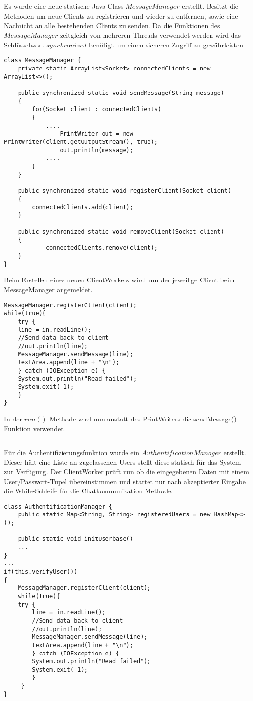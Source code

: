 \documentclass[12pt]{article}
\theoremstyle{plain}
\begin{document}
\subsection{}
Es wurde eine neue statische Java-Class $MessageManager$ erstellt.
Besitzt die Methoden um neue Clients zu registrieren und wieder zu entfernen, sowie eine Nachricht an alle bestehenden Clients zu senden.
Da die Funktionen des $MessageManager$ zeitgleich von mehreren Threads verwendet werden wird das Schlüsselwort $synchronized$ benötigt um einen sicheren Zugriff zu gewährleisten.
\begin{lstlisting}
class MessageManager {
	private static ArrayList<Socket> connectedClients = new ArrayList<>();

	public synchronized static void sendMessage(String message)
	{
		for(Socket client : connectedClients)
		{
			....			
				PrintWriter out = new PrintWriter(client.getOutputStream(), true);
				out.println(message);
			....
		}
	}

	public synchronized static void registerClient(Socket client)
	{
		connectedClients.add(client);
	}

	public synchronized static void removeClient(Socket client)
	{
			connectedClients.remove(client);
	}
}
\end{lstlisting}
Beim Erstellen eines neuen ClientWorkers wird nun der jeweilige Client beim MessageManager angemeldet.
\begin{lstlisting}
MessageManager.registerClient(client);
while(true){
	try {
	line = in.readLine();
	//Send data back to client
	//out.println(line);
	MessageManager.sendMessage(line);
	textArea.append(line + "\n");
	} catch (IOException e) {
	System.out.println("Read failed");
	System.exit(-1);
	}
}
\end{lstlisting}
In der $run()$ Methode wird nun anstatt des PrintWriters die sendMessage() Funktion verwendet.
\subsection{}
Für die Authentifizierungsfunktion wurde ein $AuthentificationManager$ erstellt.
Dieser hält eine Liste an zugelassenen Users stellt diese statisch für das System zur Verfügung.
Der ClientWorker prüft nun ob die eingegebenen Daten mit einem User/Passwort-Tupel übereinstimmen und startet nur nach akzeptierter Eingabe die While-Schleife für die Chatkommunikation Methode.
\begin{lstlisting}
class AuthentificationManager {
	public static Map<String, String> registeredUsers = new HashMap<>();

	public static void initUserbase()
	...
}
...
if(this.verifyUser())
{
	MessageManager.registerClient(client);
	while(true){
	try {
		line = in.readLine();
		//Send data back to client
		//out.println(line);
		MessageManager.sendMessage(line);
		textArea.append(line + "\n");
		} catch (IOException e) {
		System.out.println("Read failed");
		System.exit(-1);
		}
	 }
}
\end{lstlisting}
\end{document}
